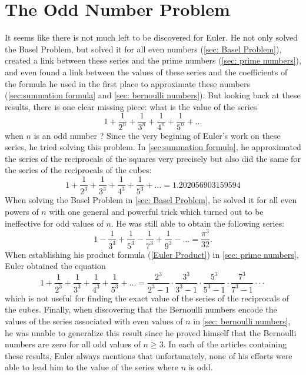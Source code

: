\section{The Odd Number Problem}

It seems like there is not much left to be discovered for Euler. He not only solved the Basel Problem, but solved it for all even numbers (\autoref{sec: Basel Problem}), created a link between these series and the prime numbers (\autoref{sec: prime numbers}), and even found a link between the values of these series and the coefficients of the formula he used in the first place to approximate these numbers (\autoref{sec:summation formula} and \autoref{sec: bernoulli numbers}). But looking back at these results, there is one clear missing piece: what is the value of the series
$$1 + \frac{1}{2^n} + \frac{1}{3^n} + \frac{1}{4^n} + \frac{1}{5^n} + \dots$$
when $n$ is an odd number ? Since the very begining of Euler's work on these series, he tried solving this problem. In \autoref{sec:summation formula}, he approximated the series of the reciprocals of the squares very precisely but also did the same for the series of the reciprocals of the cubes:
$$1 + \frac{1}{2^3} + \frac{1}{3^3} + \frac{1}{4^3} + \frac{1}{5^3}+ \dots = 1.202056903159594$$
When solving the Basel Problem in \autoref{sec: Basel Problem}, he solved it for all even powers of $n$ with one general and powerful trick which turned out to be ineffective for odd values of $n$. He was still able to obtain the following series:
$$1 - \frac{1}{3^3} + \frac{1}{5^3} - \frac{1}{7^3} + \frac{1}{9^3} - \dots = \frac{\pi^3}{32}.$$
When establishing his product formula (\ref{Euler Product}) in \autoref{sec: prime numbers}, Euler obtained the equation
$$1 + \frac{1}{2^3} + \frac{1}{3^3} + \frac{1}{4^3} + \frac{1}{5^3}+ \dots = \frac{2^3}{2^3 - 1}\cdot \frac{3^3}{3^3 - 1}\cdot\frac{5^3}{5^3 - 1}\cdot\frac{7^3}{7^3 - 1}\cdot\cdot\cdot$$
which is not useful for finding the exact value of the series of the reciprocals of the cubes. Finally, when discovering that the Bernoulli numbers encode the values of the series associated with even values of $n$ in \autoref{sec: bernoulli numbers}, he was unable to generalize this result since he proved himself that the Bernoulli numbers are zero for all odd values of $n \geq 3$. In each of the articles containing these results, Euler always mentions that unfortunately, none of his efforts were able to lead him to the value of the series where $n$ is odd.

